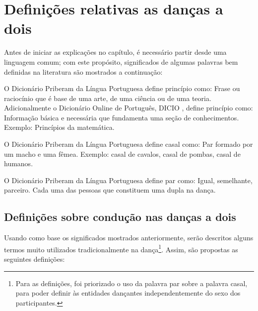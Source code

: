 
\section{Definições relativas as danças a dois}

Antes de iniciar as explicações no capítulo, 
é necessário partir desde uma linguagem comum;
com este propósito, 
significados de algumas palavras bem definidas na literatura são mostrados a continuação:
 
\begin{definition}[Princípio:] 
\label{def:Principio}O Dicionário Priberam da Língua Portuguesa \cite{priberamprincipio} define princípio como:
Frase ou raciocínio que é base de uma arte, de uma ciência ou de uma teoria.
Adicionalmente o Dicionário Online de Português, DICIO \cite{dicioprincipio}, define princípio como:
Informação básica e necessária que fundamenta uma seção de conhecimentos.
Exemplo: Princípios da matemática.
\end{definition}

\begin{definition}[Casal:] 
\label{def:Casal} O Dicionário Priberam da Língua Portuguesa \cite{priberamcasal} define casal como:
Par formado por um macho e uma fêmea.
Exemplo: casal de cavalos, casal de pombas, casal de humanos.
\end{definition}

\begin{definition}[Par:] 
\label{def:Par} O Dicionário Priberam da Língua Portuguesa \cite{priberampar} define par como:
Igual, semelhante, parceiro.
Cada uma das pessoas que constituem uma dupla na dança.
\end{definition}


\subsection{Definições sobre condução nas danças a dois}
Usando como base os significados mostrados anteriormente, 
serão descritos alguns termos muito utilizados tradicionalmente na dança\footnote{
Para as definições, foi priorizado o uso da palavra par sobre a palavra casal,
para poder definir às entidades dançantes independentemente do sexo dos participantes.}.
Assim,  são propostas as seguintes definições:

